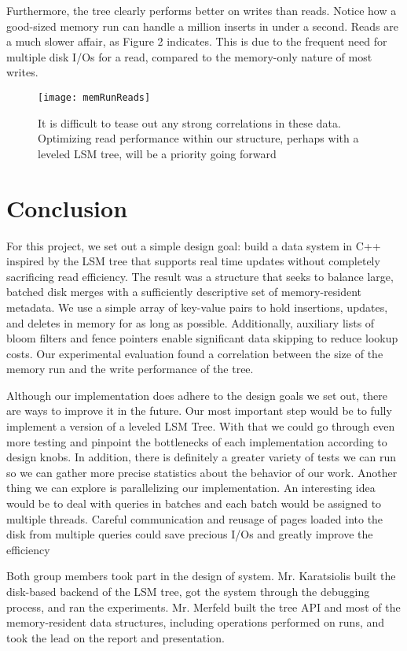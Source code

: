 \documentclass[12pt]{article}
\begin{document}
Furthermore, the tree clearly performs better on writes than reads. Notice how a good-sized memory run can handle a million inserts in under a second. Reads are a much slower affair, as Figure 2 indicates. This is due to the frequent need for multiple disk I/Os for a read, compared to the memory-only nature of most writes.
  \begin{figure}[h!]
 \centering
  \texttt{[image: memRunReads]}
 \caption{It is difficult to tease out any strong correlations in these data. Optimizing read performance within our structure, perhaps with a leveled LSM tree, will be a priority going forward}
 \end{figure}

\section{Conclusion}
\indent \indent For this project, we set out a simple design goal: build a data system in C++ inspired by the LSM tree that supports real time updates without completely sacrificing read efficiency. The result was a structure that seeks to balance large, batched disk merges with a sufficiently descriptive set of memory-resident metadata. We use a simple array of key-value pairs to hold insertions, updates, and deletes in memory for as long as possible. Additionally, auxiliary lists of bloom filters and fence pointers enable significant data skipping to reduce lookup costs. Our experimental evaluation found a correlation between the size of the memory run and the write performance of the tree.
	
	Although our implementation does adhere to the design goals we set out, there are ways to improve it in the future. Our most important step would be to fully implement a version of a leveled LSM Tree. With that we could go through even more testing and pinpoint the bottlenecks of each implementation according to design knobs. In addition, there is definitely a greater variety of tests we can run so we can gather more precise statistics about the behavior of our work. Another thing we can explore is parallelizing our implementation. An interesting idea would be to deal with queries in batches and each batch would be assigned to multiple threads. Careful communication and reusage of pages loaded into the disk from multiple queries could save precious I/Os and greatly improve the efficiency
	
	Both group members took part in the design of system. Mr. Karatsiolis built the disk-based backend of the LSM tree, got the system through the debugging process, and ran the experiments. Mr. Merfeld built the tree API and most of the memory-resident data structures, including operations performed on runs, and took the lead on the report and presentation.
	
\end{document}
